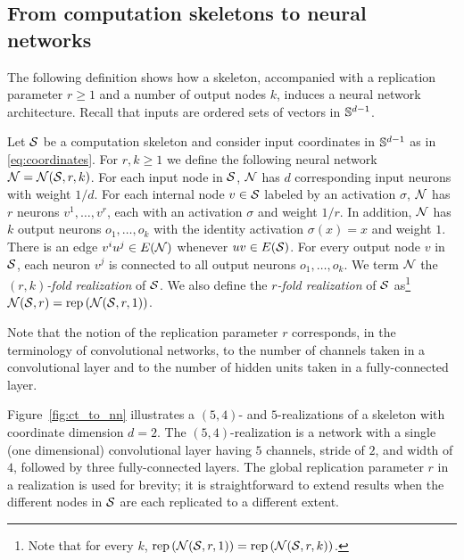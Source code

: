 \subsection{From computation skeletons to neural networks}
%
The following definition shows how a skeleton, accompanied with a
replication parameter $r\ge 1$ and a number of output nodes $k$,
induces a neural network architecture. Recall that inputs are ordered
sets of vectors in ${\mathbb S}^{d-1}$.
%
\begin{definition}
%
Let ${\cal S}$ be a computation skeleton and consider input coordinates in
${\mathbb S}^{d-1}$ as in \eqref{eq:coordinates}. For $r, k \ge 1$ we
define the following neural network ${\cal N}={\cal N}({\cal S},r,k)$.
%
For each input node in ${\cal S}$, ${\cal N}$ has $d$ corresponding input
neurons with weight $1/d$. For each internal node $v\in {\cal S}$ labeled by an activation
$\sigma$, ${\cal N}$ has $r$ neurons $v^1,\ldots,v^r$, each with an
activation $\sigma$ and weight $1/r$. In addition, ${\cal N}$ has $k$ output neurons
$o_1,\ldots,o_k$ with the identity activation $\sigma(x)=x$ and weight $1$.
%
There is an edge $v^iu^j\in E({\cal N})$ whenever $uv\in
E({\cal S})$.  For every output node $v$ in ${\cal S}$, each neuron $v^j$ is
connected to all output neurons $o_1,\ldots,o_k$. We term ${\cal N}$ the
{\em $(r,k)$-fold realization} of ${\cal S}$. We also define the {\em $r$-fold realization} of ${\cal S}$ as\footnote{Note that for every $k$,
$\mathrm{rep}\left({\cal N}({\cal S},r,1)\right)=\mathrm{rep}\left({\cal N}({\cal S},r,k)\right)$.} ${\cal N}({\cal S},r)= \mathrm{rep}\left({\cal N}({\cal S},r,1)\right)$.
%
\end{definition}

%
\noindent
Note that the notion of the replication parameter $r$ corresponds, in
the terminology of convolutional networks, to the number of
channels taken in a convolutional layer and to the number of hidden units
taken in a fully-connected layer.

Figure~\ref{fig:ct_to_nn} illustrates a $(5,4)$- and $5$-realizations
of a skeleton with coordinate dimension $d=2$.  The
$(5,4)$-realization is a network with a single (one dimensional)
convolutional layer having $5$ channels, stride of $2$, and width of
$4$, followed by three fully-connected layers. The global replication
parameter $r$ in a realization is used for brevity; it is
straightforward to extend results when the different nodes in ${\cal S}$
are each replicated to a different extent.

